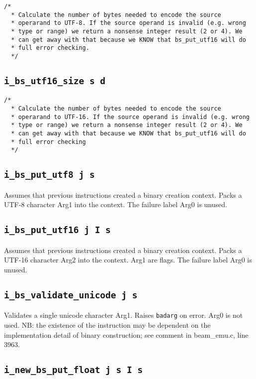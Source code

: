 \documentclass{article}
\newcommand{\iop}[1]{\texttt{#1}}
\begin{document}
\begin{verbatim}
/*
  * Calculate the number of bytes needed to encode the source
  * operarand to UTF-8. If the source operand is invalid (e.g. wrong
  * type or range) we return a nonsense integer result (2 or 4). We
  * can get away with that because we KNOW that bs_put_utf16 will do
  * full error checking.
  */
\end{verbatim}

\subsection*{\iop{i\_bs\_utf16\_size s d}}

\begin{verbatim}
/*
  * Calculate the number of bytes needed to encode the source
  * operarand to UTF-16. If the source operand is invalid (e.g. wrong
  * type or range) we return a nonsense integer result (2 or 4). We
  * can get away with that because we KNOW that bs_put_utf16 will do
  * full error checking
  */
\end{verbatim}

\subsection*{\iop{i\_bs\_put\_utf8 j s}}

Assumes that previous instructions created a binary creation context. Packs a
UTF-8 character Arg1 into the context. The failure label Arg0 is unused.

\subsection*{\iop{i\_bs\_put\_utf16 j I s}}

Assumes that previous instructions created a binary creation context. Packs a
UTF-16 character Arg2 into the context. Arg1 are flags. The failure label Arg0
is unused.

\subsection*{\iop{i\_bs\_validate\_unicode j s}}

Validates a single unicode character Arg1. Raises \verb$badarg$ on error. Arg0
is not used. NB: the existence of the instruction may be dependent on the
implementation detail of binary construction; see comment in beam\_emu.c, line
3963.

\subsection*{\iop{i\_new\_bs\_put\_float j s I s}}
\end{document}
